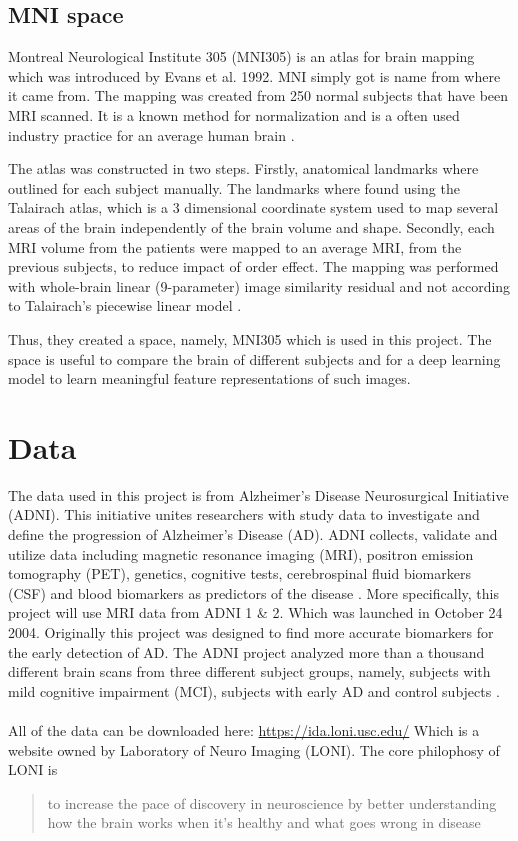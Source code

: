 \documentclass[12pt, fleqn, titlepage]{article}
\begin{document}
\subsection{MNI space}
Montreal Neurological Institute 305 (MNI305) is an atlas for brain mapping which was introduced by Evans et al. 1992. MNI simply got is name from where it came from. The mapping was created from 250 normal subjects that have been MRI scanned. It is a known method for normalization and is a often used industry practice for an average human brain  \cite{evans}. 

The atlas was constructed in two steps. Firstly, anatomical landmarks where outlined for each subject manually. The landmarks where found using the Talairach atlas, which is a 3 dimensional coordinate system used to map several areas of the brain independently of the brain volume and shape. Secondly, each MRI volume from the patients were mapped to an average MRI, from the previous subjects, to reduce impact of order effect. The mapping was performed with whole-brain linear (9-parameter) image similarity residual and not according to Talairach's piecewise linear model \cite{collins}. 

Thus, they created a space, namely, MNI305 which is used in this project. The space is useful to compare the brain of different subjects and for a deep learning model to learn meaningful feature representations of such images. 


\section{Data} 


The data used in this project is from Alzheimer's Disease Neurosurgical Initiative (ADNI). This initiative unites researchers with study data to investigate and define the progression of Alzheimer's Disease (AD). 
ADNI collects, validate and utilize data including magnetic resonance imaging (MRI), positron emission tomography (PET), genetics, cognitive tests, cerebrospinal fluid biomarkers (CSF) and blood biomarkers as predictors of the disease \cite{adni}.
More specifically, this project will use MRI data from ADNI 1 \& 2. 
Which was launched in October 24 2004. Originally this project was designed to find more accurate biomarkers for the early detection of AD.
The ADNI project analyzed more than a thousand different brain scans from three different subject groups, namely, subjects with mild cognitive impairment (MCI), subjects with early AD and control subjects \cite{adni1}. 
\\\\
All of the data can be downloaded here: \url{https://ida.loni.usc.edu/} \newline
Which is a website owned by Laboratory of Neuro Imaging (LONI). The core philophosy of LONI is \blockcquote{loni}{to increase the pace of discovery in neuroscience by better understanding how the brain works when it’s healthy and what goes wrong in disease}.
\end{document}
